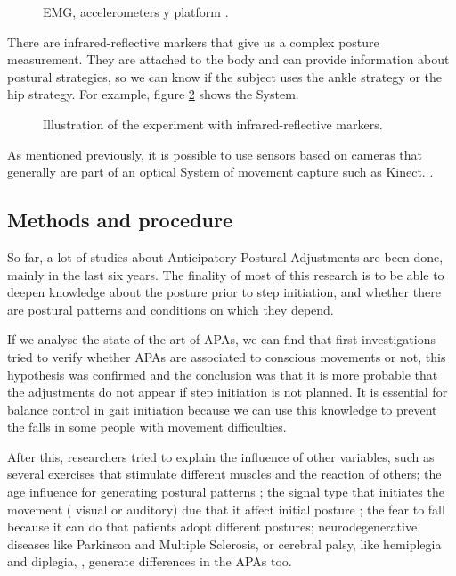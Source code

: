 \begin{figure}[H]
	\centering
	\caption{EMG, accelerometers y platform \cite{Gay2011}.}
	\label{fig:Captura}
\end{figure}

There are  infrared-reflective markers that give us a complex posture measurement. They are attached  to the body and can provide information about postural strategies, so we can know if the subject uses the ankle strategy or the hip strategy. For example, figure \ref{fig:Captura2} shows the System.

\begin{figure}[H]
	\centering
	\caption{Illustration of the experiment with infrared-reflective markers\cite{Teddy2013}.}
	\label{fig:Captura2}
\end{figure}

As mentioned previously, it is possible to use sensors based on cameras that generally are part of an optical System of movement capture such as Kinect. \cite{Instr5}.


\subsection{Methods and procedure}

So far, a lot of studies about Anticipatory Postural Adjustments are been done, mainly in the last six years. The finality of most of this research is to be able to deepen knowledge about the posture prior to step initiation, and whether there are postural patterns and conditions on which they depend.

If we analyse the state of the art of APAs, we can find that first investigations tried to verify whether APAs are associated to conscious movements or not,  this hypothesis was confirmed and the conclusion was that it is more probable that the adjustments do not appear if step initiation is not planned. It is essential for balance control in gait initiation because we can use this knowledge to prevent the falls in some people with movement difficulties\cite{Mcllroy1993}\cite{Yiou2012}\cite{Teddy2013}\cite{Bouisset2008}\cite{Neeta2014}.

After this, researchers tried to explain the influence of other variables, such as several exercises that stimulate different muscles and the reaction of others\cite{Gay2011}; the age influence for generating postural patterns \cite{Bleuse2006} \cite{Estelle2008}; the signal type that initiates the movement ( visual or auditory) due that it affect initial posture \cite{Mcllroy1993}\cite{Antonia2009}\cite{Vicent1999}\cite{Tard2013}; the fear to fall because it can do that patients adopt different postures\cite{Chris2005}; neurodegenerative diseases like Parkinson and Multiple Sclerosis\cite{Mancini2009}\cite{Jebb2008}\cite{Chris2005}\cite{Hall2013}, or cerebral palsy, like hemiplegia and diplegia, \cite{Hall2013}, generate differences in the APAs too.

